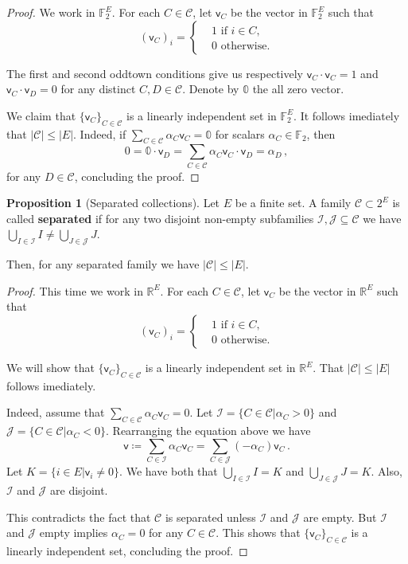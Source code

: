 \documentclass[12pt]{amsart}
\theoremstyle{definition}
\newtheorem{prop}[thm]{Proposition}
\newcommand{\R}{\mathbb{R}}
\newcommand{\F}{\mathbb{F}}
\newcommand{\CC}{\mathcal C}
\newcommand{\JJ}{\mathcal J}
\newcommand{\II}{\mathcal I}
\newcommand{\vv}{\mathsf{v}}
\begin{document}
\begin{proof}
We work in $\F_2^E$.
For each $C \in \CC$, let $\vv_C$ be the vector in $\F_2^E$ such that 
$$ (\vv_C)_i =\begin{cases*}
      & 1 \text{ if $i \in C$,}\\
      & 0 \text{ otherwise.}
    \end{cases*} $$

The first and second oddtown conditions give us respectively $\vv_C \cdot \vv_C = 1$ and $\vv_C \cdot \vv_D = 0 $ for any distinct $C, D \in \CC$.
Denote by $\mathbb{0}$ the all zero vector.

We claim that $\{\vv_C\}_{C \in \CC}$ is a linearly independent set in $\F_2^E$.
It follows imediately that $|\CC| \leq |E|$.
Indeed, if $\sum_{C \in \CC} \alpha_C \vv_C = \mathbb{0}$ for scalars $\alpha_C \in \F_2$, then
$$ 0 = \mathbb{0} \cdot \vv_D = \sum_{C \in \CC} \alpha_C \vv_C\cdot \vv_D = \alpha_D\, ,$$
for any $D \in \CC$, concluding the proof.
\end{proof}


\begin{prop}[Separated collections]
Let $E$ be a finite set.
A family $\CC \subset 2^E $ is called \textbf{separated} if for any two disjoint non-empty subfamilies $\II, \JJ \subseteq \CC$ we have $\bigcup_{I\in\II} I \neq \bigcup_{J\in\JJ} J$.

Then, for any separated family we have $|\CC| \leq |E|$.
\end{prop}


\begin{proof}
This time we work in $\R^E$.
For each $C \in \CC$, let $\vv_C$ be the vector in $\R^E$ such that 
$$ (\vv_C)_i =\begin{cases*}
      & 1 \text{ if $i \in C$,}\\
      & 0 \text{ otherwise.}
    \end{cases*} $$


We will show that $ \{ \vv_C\}_{C\in \CC}$ is a linearly independent set in $\R^E$.
That $|\CC| \leq |E|$ follows imediately.

Indeed, assume that $\sum_{C \in \CC} \alpha_C \vv_C = 0$.
Let $\II = \{C \in \CC | \alpha_C > 0\}$ and $\JJ = \{C \in \CC | \alpha_C < 0\}$.
Rearranging the equation above we have
$$\vv \coloneqq \sum_{C \in \II} \alpha_C \vv_C  = \sum_{C \in \JJ} (- \alpha_C) \vv_C\, .$$
Let $K = \{i \in E| \vv_i \neq 0\}$.
We have both that $\bigcup_{I\in\II} I = K$ and $\bigcup_{J\in\JJ} J = K$.
Also, $\II$ and $\JJ$ are disjoint.

This contradicts the fact that $\CC$ is separated unless $\II$ and $\JJ$ are empty.
But $\II$ and $\JJ$ empty implies $\alpha_C = 0 $ for any $C \in \CC$.
This shows that $ \{ \vv_C\}_{C\in \CC}$ is a linearly independent set, concluding the proof.
\end{proof}
\end{document}
